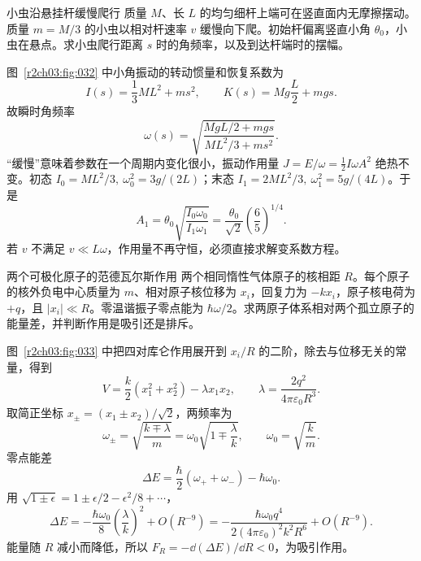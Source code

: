 \begin{practicebox}{小虫沿悬挂杆缓慢爬行}
质量 $M$、长 $L$ 的均匀细杆上端可在竖直面内无摩擦摆动。质量 $m=M/3$ 的小虫以相对杆速率 $v$ 缓慢向下爬。初始杆偏离竖直小角 $\theta_0$，小虫在悬点。求小虫爬行距离 $s$ 时的角频率，以及到达杆端时的摆幅。
\label{r2ch03:pr:016}
\begin{solution}
图~\ref{r2ch03:fig:032} 中小角振动的转动惯量和恢复系数为
\[
 I(s)=\frac13ML^2+ms^2,\qquad
 K(s)=Mg\frac L2+mgs .
\]
故瞬时角频率
\[
 \boxed{\omega(s)=
 \sqrt{\frac{MgL/2+mgs}{ML^2/3+ms^2}}}.
\]
“缓慢”意味着参数在一个周期内变化很小，振动作用量
$J=E/\omega=\frac12I\omega A^2$ 绝热不变。初态
$I_0=ML^2/3,\ \omega_0^2=3g/(2L)$；末态
$I_1=2ML^2/3,\ \omega_1^2=5g/(4L)$。于是
\[
 \boxed{A_1=\theta_0
 \sqrt{\frac{I_0\omega_0}{I_1\omega_1}}
 =\frac{\theta_0}{\sqrt2}\left(\frac65\right)^{1/4}}.
\]
若 $v$ 不满足 $v\ll L\omega$，作用量不再守恒，必须直接求解变系数方程。
\figInsectRod
\end{solution}
\end{practicebox}

\begin{practicebox}{两个可极化原子的范德瓦尔斯作用}
两个相同惰性气体原子的核相距 $R$。每个原子的核外负电中心质量为 $m$、相对原子核位移为 $x_i$，回复力为 $-kx_i$，原子核电荷为 $+q$，且 $|x_i|\ll R$。零温谐振子零点能为 $\hbar\omega/2$。求两原子体系相对两个孤立原子的能量差，并判断作用是吸引还是排斥。
\label{r2ch03:pr:017}
\begin{solution}
图~\ref{r2ch03:fig:033} 中把四对库仑作用展开到 $x_i/R$ 的二阶，除去与位移无关的常量，得到
\[
 V=\frac k2(x_1^2+x_2^2)-\lambda x_1x_2,\qquad
 \lambda=\frac{2q^2}{4\pi\varepsilon_0R^3}.
\]
取简正坐标 $x_\pm=(x_1\pm x_2)/\sqrt2$，两频率为
\[
 \omega_\pm=\sqrt{\frac{k\mp\lambda}{m}}
 =\omega_0\sqrt{1\mp\frac{\lambda}{k}},
 \qquad \omega_0=\sqrt{\frac km}.
\]
零点能差
\[
 \Delta E=\frac{\hbar}{2}(\omega_++\omega_-)-\hbar\omega_0.
\]
用 $\sqrt{1\pm\epsilon}=1\pm\epsilon/2-\epsilon^2/8+\cdots$，
\[
 \boxed{\Delta E=
 -\frac{\hbar\omega_0}{8}\left(\frac{\lambda}{k}\right)^2
+O(R^{-9})
=-\frac{\hbar\omega_0q^4}
{2(4\pi\varepsilon_0)^2k^2R^6}+O(R^{-9})}.
\]
能量随 $R$ 减小而降低，所以 $F_R=-\dd(\Delta E)/\dd R<0$，为吸引作用。
\figPolarizedAtoms
\end{solution}
\end{practicebox}

